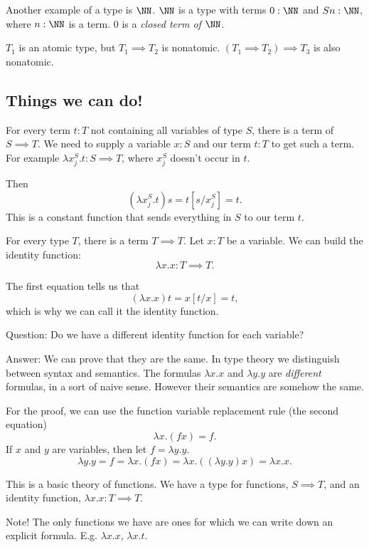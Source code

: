 \documentclass{article}
\begin{document}
Another example of a type is $\NN$. $\NN$ is a type with 
terms $0:\NN$ and $Sn :\NN$, where $n:\NN$ is a term.
$0$ is a \emph{closed term of $\NN$}.

$T_1$ is an atomic type, but $T_1\implies T_2$ is nonatomic.
$(T_1\implies T_2)\implies T_3$ is also nonatomic.

\subsection{Things we can do!}

\begin{example}
For every term $t:T$ not containing all variables of type $S$,
there is a term of $S\implies T$.
We need to supply a variable $x:S$ and our term $t:T$ to get 
such a 
term. For example $\lambda x_j^S.t:S\implies T$, where $x_j^S$
doesn't occur in $t$.

Then \[ (\lambda x_j^S.t) s = t[s/x_j^S] = t. \] 
This is a constant 
function that sends everything in $S$ to our term $t$.
\end{example}

\begin{example}
    For every type $T$, there is a term $T\implies T$.
    Let $x:T$ be a variable. We can build the identity function:
    \[ \lambda x.x : T\implies T. \]

    The first equation tells us that 
    \[ (\lambda x.x)t = x[t/x] = t,
    \]
    which is why we can call it the identity function.

    Question: Do we have a different identity function for each
    variable?

    Answer: We can prove that they are the same. In type theory
    we distinguish between syntax and semantics.
    The formulas $\lambda x.x$ and $\lambda y.y$ are 
    \emph{different} formulas, in a sort of naive sense. However
    their semantics are somehow the same.

    For the proof, we can use the 
    function variable replacement rule (the second equation)
    \[ \lambda x.(fx) = f. \]
    If $x$ and $y$ are variables, then let $f=\lambda y.y$.
    \[ \lambda y.y = f = \lambda x.(fx) 
    = \lambda x.((\lambda y.y)x) = \lambda x.x. \]
\end{example}

This is a basic theory of functions. We have a type for functions,
$S\implies T$, and an identity function, 
$\lambda x.x : T\implies T$.

Note! The only functions we have are ones for which we can write 
down an explicit formula. E.g. $\lambda x.x$, $\lambda x.t$.
\end{document}
